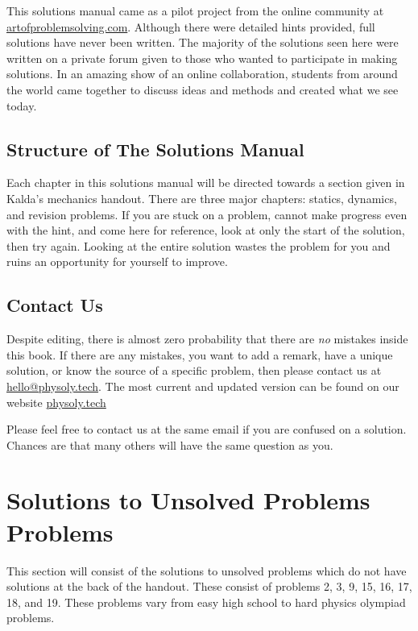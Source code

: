 \documentclass[11pt]{article}
\begin{document}
This solutions manual came as a pilot project from the online community at \url{artofproblemsolving.com}. Although there were detailed hints provided, full solutions have never been written. The majority of the solutions seen here were written on a private forum given to those who wanted to participate in making solutions. In an amazing show of an online collaboration, students from around the world came together to discuss ideas and methods and created what we see today.

\subsection*{Structure of The Solutions Manual}
\vspace{-5mm}
Each chapter in this solutions manual will be directed towards a section given in Kalda's mechanics handout. There are three major chapters: statics, dynamics, and revision problems. If you are stuck on a problem, cannot make progress even with the hint, and come here for reference, look at only the start of the solution, then try again. Looking at the entire solution wastes the problem for you and ruins an opportunity for yourself to improve.

\subsection*{Contact Us}
\vspace{-5mm}
Despite editing, there is almost zero probability that there are \textit{no} mistakes inside this book. If there are any mistakes, you want to add a remark, have a unique solution, or know the source of a specific problem, then please contact us at \url{hello@physoly.tech}. The most current and updated version can be found on our website \url{physoly.tech}

Please feel free to contact us at the same email if you are confused on a solution. Chances are that many others will have the same question as you.

\newpage
\section{Solutions to Unsolved Problems Problems}
\vspace{-5mm}
This section will consist of the solutions to unsolved problems which do not have solutions at the back of the handout. These consist of problems 2, 3, 9, 15, 16, 17, 18, and 19. These problems vary from easy high school to hard physics olympiad problems.






\newpage



\end{document}

